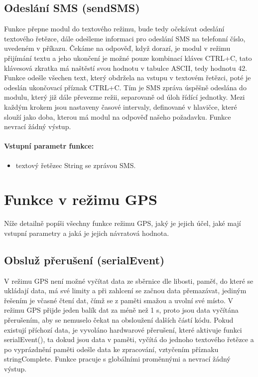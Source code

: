 \documentclass[FM,MP]{tulthesis}  %
\begin{document}
\subsection{Odeslání SMS (sendSMS)}
Funkce přepne modul do textového režimu, bude tedy očekávat odeslání textového řetězce, dále odešleme informaci pro odeslání SMS na telefonní číslo, uvedeném v příkazu. Čekáme na odpověď, když dorazí, je modul v režimu přijímání textu a jeho ukončení je možné pouze kombinací kláves CTRL+C, tato klávesová zkratka má naštěstí svou hodnotu v tabulce ASCII, tedy hodnotu 42. Funkce odešle všechen text, který obdržela na vstupu v textovém řetězci, poté je odeslán ukončovací příznak CTRL+C. Tím je SMS zpráva úspěšně odeslána do modulu, který již dále převezme režii, separovaně od úloh řídící jednotky. Mezi každým krokem jsou nastaveny časové intervaly, definované v hlavičce, které slouží jako doba, kterou má modul na odpověď našeho požadavku. Funkce nevrací žádný výstup.

\paragraph{Vstupní parametr funkce:}
\begin{itemize}
\item textový řetězec String se zprávou SMS.
\end{itemize}


\section{Funkce v režimu GPS}
Níže detailně popíši všechny funkce režimu GPS, jaký je jejich účel, jaké mají vstupní parametry a jaká je jejich návratová hodnota.

\subsection{Obsluž přerušení (serialEvent)}
V režimu GPS není možné vyčítat data ze sběrnice dle libosti, paměť, do které se ukládají data, má své limity a při zahlcení se začnou data přemazávat, jediným řešením je včasné čtení dat, čímž se z paměti smažou a uvolní své místo. V režimu GPS přijde jeden balík dat za méně než 1 s, proto jsou data vyčítána přerušením, aby se nemuselo čekat na obsloužení dalších částí kódu. Pokud existují příchozí data, je vyvoláno hardwarové přerušení, které aktivuje funkci serialEvent(), ta dokud jsou data v paměti, vyčítá do jednoho textového řetězce a po vyprázdnění paměti odešle data ke zpracování, vztyčením příznaku stringComplete. Funkce pracuje s globálními proměnnými a nevrací žádný výstup.
\end{document}
